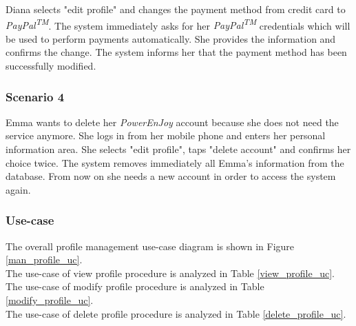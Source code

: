Diana selects "edit profile" and changes the payment method from credit card to \emph{PayPal\textsuperscript{TM}}. The system immediately asks for her \emph{PayPal\textsuperscript{TM}} credentials which will be used to perform payments automatically. She provides the information and confirms the change. The system informs her that the payment method has been successfully modified.

\subsubsection{Scenario 4}
Emma wants to delete her \emph{PowerEnJoy} account because she does not need the service anymore. She logs in from her mobile phone and enters her personal information area. She selects "edit profile", taps "delete account" and confirms her choice twice. The system removes immediately all Emma's information from the database. From now on she needs a new account in order to access the system again.

\subsubsection{Use-case}
The overall profile management use-case diagram is shown in Figure \ref{man_profile_uc}. \\
The use-case of view profile procedure is analyzed in Table \ref{view_profile_uc}. \\
The use-case of modify profile procedure is analyzed in Table \ref{modify_profile_uc}. \\
The use-case of delete profile procedure is analyzed in Table \ref{delete_profile_uc}.

